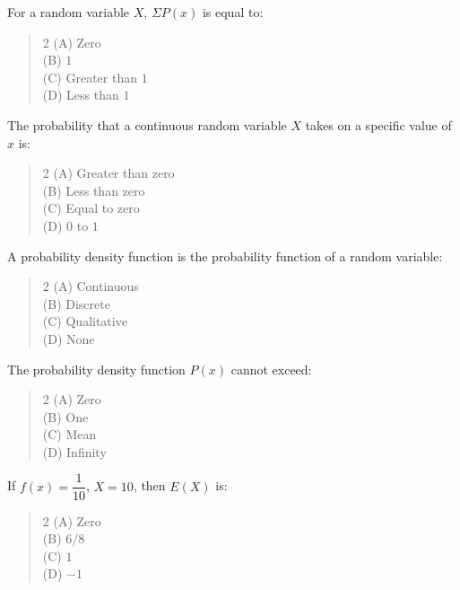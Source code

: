 \documentclass[11pt,a4paper]{article}
\begin{document}
\begin{mcqlist}
\item For a random variable $X$, $\Sigma P(x)$ is equal to:
\begin{quote}\begin{multicols}{2}
\noindent (A) Zero \\
(B) $1$ \\
(C) Greater than $1$ \\
(D) Less than $1$
\end{multicols}\end{quote}

\item The probability that a continuous random variable $X$ takes on a specific value of $x$ is:
\begin{quote}\begin{multicols}{2}
\noindent (A) Greater than zero \\
(B) Less than zero \\
(C) Equal to zero \\
(D) $0$ to $1$
\end{multicols}\end{quote}

\item A probability density function is the probability function of a \underline{\hspace{1.5cm}} random variable:
\begin{quote}\begin{multicols}{2}
\noindent (A) Continuous \\
(B) Discrete \\
(C) Qualitative \\
(D) None
\end{multicols}\end{quote}

\item The probability density function $P(x)$ cannot exceed:
\begin{quote}\begin{multicols}{2}
\noindent (A) Zero \\
(B) One \\
(C) Mean \\
(D) Infinity
\end{multicols}\end{quote}

\item If $f(x)=\dfrac{1}{10}$, $X=10$, then $E(X)$ is:
\begin{quote}\begin{multicols}{2}
\noindent (A) Zero \\
(B) $6/8$ \\
(C) $1$ \\
(D) $-1$
\end{multicols}\end{quote}


\end{mcqlist}
\end{document}
